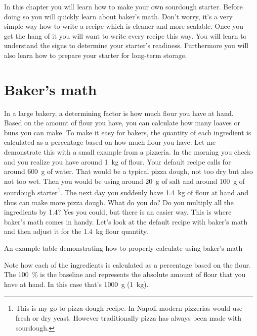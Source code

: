 \begin{quoting}
In this chapter you will learn how to make your
own sourdough starter. Before doing so you will
quickly learn about baker's math. Don't worry,
it's a very simple way how to write a recipe which
is cleaner and more scalable. Once you get the hang
of it you will want to write every recipe this way.
You will learn to understand the signs to determine
your starter's readiness. Furthermore you will
also learn how to prepare your starter for long-term storage.
\end{quoting}

\section{Baker's math}%
\label{section:bakers-math}

In a large bakery, a determining factor is how
much flour you have at hand. Based on the amount
of flour you have, you can calculate how many
loaves or buns you can make. To make it easy
for bakers, the quantity of each ingredient
is calculated as a percentage based on how much flour you have.
Let me demonstrate this with a small example from
a pizzeria. In the morning you check and you realize you
have around  \qty{1}{\kg} of flour.
Your default recipe calls for around \qty{600}{\gram} of water.
That would be a typical pizza dough, not too dry but
also not too wet. Then you would be using around \qty{20}{\gram}
of salt and around \qty{100}{\gram} of sourdough starter\footnote{This is my go to
pizza dough recipe. In Napoli modern pizzerias would use fresh or dry yeast.
However traditionally pizza has always been made with sourdough.}.
The next day you suddenly have \qty{1.4}{\kg} of flour
at hand and thus can make more pizza dough. What do you do?
Do you multiply all the ingredients by 1.4? Yes you could,
but there is an easier way. This is where baker's math
comes in handy. Let's look at the default recipe with baker's
math and then adjust it for the \qty{1.4}{\kg} flour quantity.

\begin{table}[!htb]
\begin{center}
  
  \caption[Baker's math example]{An example table demonstrating how to
      properly calculate using baker's math}
\end{center}
\end{table}

Note how each of the ingredients is calculated as a percentage
based on the flour. The \qty{100}{\percent} is the baseline and represents the absolute
amount of flour that you have at hand. In this case that's \qty{1000}{\gram}
(\qty{1}{\kg}).

